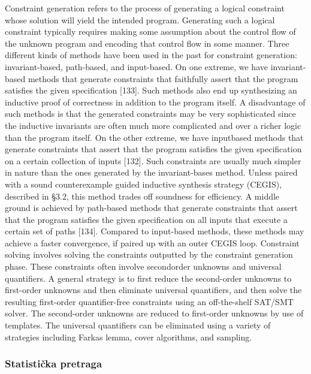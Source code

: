 Constraint generation refers to the process of generating a logical
constraint whose solution will yield the intended program. Generating
such a logical constraint typically requires making some assumption
about the control flow of the unknown program and encoding that
control flow in some manner. Three different kinds of methods have been
used in the past for constraint generation: invariant-based, path-based,
and input-based. On one extreme, we have invariant-based methods
that generate constraints that faithfully assert that the program satisfies
the given specification [133].
Such methods also end up synthesizing an inductive proof of correctness
in addition to the program itself. A disadvantage of such methods
is that the generated constraints may be very sophisticated since the
inductive invariants are often much more complicated and over a richer
logic than the program itself. On the other extreme, we have inputbased
methods that generate constraints that assert that the program
satisfies the given specification on a certain collection of inputs [132].
Such constraints are usually much simpler in nature than the ones
generated by the invariant-bases method. Unless paired with a sound
counterexample guided inductive synthesis strategy (CEGIS), described
in §3.2, this method trades off soundness for efficiency. A middle ground
is achieved by path-based methods that generate constraints that assert
that the program satisfies the given specification on all inputs that
execute a certain set of paths [134]. Compared to input-based methods,
these methods may achieve a faster convergence, if paired up with an
outer CEGIS loop.
Constraint solving involves solving the constraints outputted by the
constraint generation phase. These constraints often involve secondorder
unknowns and universal quantifiers. A general strategy is to first
reduce the second-order unknowns to first-order unknowns and then
eliminate universal quantifiers, and then solve the resulting first-order
quantifier-free constraints using an off-the-shelf SAT/SMT solver. The
second-order unknowns are reduced to first-order unknowns by use of
templates. The universal quantifiers can be eliminated using a variety
of strategies including Farkas lemma, cover algorithms, and sampling.


\subsubsection{Statistička pretraga}
\label{subsubsec:Statistical}

